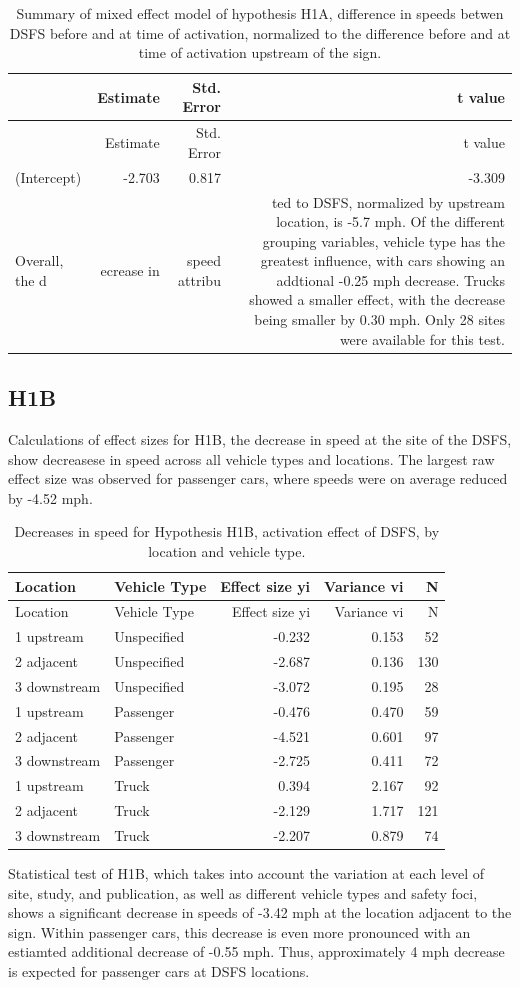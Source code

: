 \documentclass[]{article}
\begin{document}
\begin{longtable}[]{@{}lrrr@{}}
\caption{Summary of mixed effect model of hypothesis H1A, difference in
speeds betwen DSFS before and at time of activation, normalized to the
difference before and at time of activation upstream of the
sign.}\tabularnewline
\toprule
& Estimate & Std. Error & t value\tabularnewline
\midrule
\endfirsthead
\toprule
& Estimate & Std. Error & t value\tabularnewline
\midrule
\endhead
(Intercept) & -2.703 & 0.817 & -3.309\tabularnewline
Overall, the d & ecrease in & speed attribu & ted to DSFS, normalized by
upstream location, is -5.7 mph. Of the different grouping variables,
vehicle type has the greatest influence, with cars showing an addtional
-0.25 mph decrease. Trucks showed a smaller effect, with the decrease
being smaller by 0.30 mph. Only 28 sites were available for this
test.\tabularnewline
\bottomrule
\end{longtable}

\subsection{H1B}\label{h1b}

Calculations of effect sizes for H1B, the decrease in speed at the site
of the DSFS, show decreasese in speed across all vehicle types and
locations. The largest raw effect size was observed for passenger cars,
where speeds were on average reduced by -4.52 mph.

\begin{longtable}[]{@{}llrrr@{}}
\caption{Decreases in speed for Hypothesis H1B, activation effect of
DSFS, by location and vehicle type.}\tabularnewline
\toprule
Location & Vehicle Type & Effect size yi & Variance vi &
N\tabularnewline
\midrule
\endfirsthead
\toprule
Location & Vehicle Type & Effect size yi & Variance vi &
N\tabularnewline
\midrule
\endhead
1 upstream & Unspecified & -0.232 & 0.153 & 52\tabularnewline
2 adjacent & Unspecified & -2.687 & 0.136 & 130\tabularnewline
3 downstream & Unspecified & -3.072 & 0.195 & 28\tabularnewline
1 upstream & Passenger & -0.476 & 0.470 & 59\tabularnewline
2 adjacent & Passenger & -4.521 & 0.601 & 97\tabularnewline
3 downstream & Passenger & -2.725 & 0.411 & 72\tabularnewline
1 upstream & Truck & 0.394 & 2.167 & 92\tabularnewline
2 adjacent & Truck & -2.129 & 1.717 & 121\tabularnewline
3 downstream & Truck & -2.207 & 0.879 & 74\tabularnewline
\bottomrule
\end{longtable}

Statistical test of H1B, which takes into account the variation at each
level of site, study, and publication, as well as different vehicle
types and safety foci, shows a significant decrease in speeds of -3.42
mph at the location adjacent to the sign. Within passenger cars, this
decrease is even more pronounced with an estiamted additional decrease
of -0.55 mph. Thus, approximately 4 mph decrease is expected for
passenger cars at DSFS locations.
\end{document}
